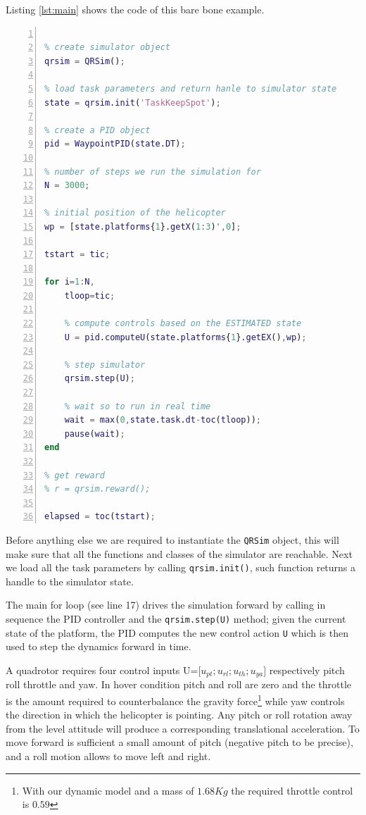 \documentclass[a4paper,11pt]{report}
\newcommand{\snamettt}{\texttt{QRSim}\xspace}
\begin{document}
Listing \ref{lst:main} shows the code of this bare bone example. 

\begin{lstlisting}[float=ht!bp,caption=main script,language=Matlab,frame=lines,label=lst:main,numbers=left,basicstyle=\small]

% create simulator object
qrsim = QRSim();

% load task parameters and return hanle to simulator state
state = qrsim.init('TaskKeepSpot');

% create a PID object
pid = WaypointPID(state.DT);

% number of steps we run the simulation for
N = 3000;

% initial position of the helicopter
wp = [state.platforms{1}.getX(1:3)',0];

tstart = tic;

for i=1:N,
    tloop=tic;

    % compute controls based on the ESTIMATED state 
    U = pid.computeU(state.platforms{1}.getEX(),wp);

    % step simulator
    qrsim.step(U);
    
    % wait so to run in real time
    wait = max(0,state.task.dt-toc(tloop));
    pause(wait);
end

% get reward
% r = qrsim.reward();

elapsed = toc(tstart);
\end{lstlisting}
Before anything else we are required to instantiate the \snamettt object, this will make sure that all the functions and classes of the simulator are reachable. Next we load all the task parameters by calling \texttt{qrsim.init()}, such function returns a handle to the simulator state.

The main for loop (see line 17) drives the simulation forward by calling in sequence the PID controller and the \texttt{qrsim.step(U)} method; given the current state of the platform, the PID computes the new control action  \texttt{U} which is then used to step the dynamics forward in time.

A quadrotor requires four control inputs U=[$u_{pt};u_{rl};u_{th};u_{ya}$] respectively pitch roll throttle and yaw.
In hover condition pitch and roll are zero and the throttle is the amount required to counterbalance the gravity force\footnote{With our dynamic model and a mass of $1.68Kg$ the required throttle control is $0.59$} while yaw controls the direction in which the helicopter is pointing.  
Any pitch or roll rotation away from the level attitude will produce a corresponding translational acceleration. To move forward is sufficient a small amount of pitch (negative pitch to be precise), and a roll motion allows to move left and right. 
\end{document}
